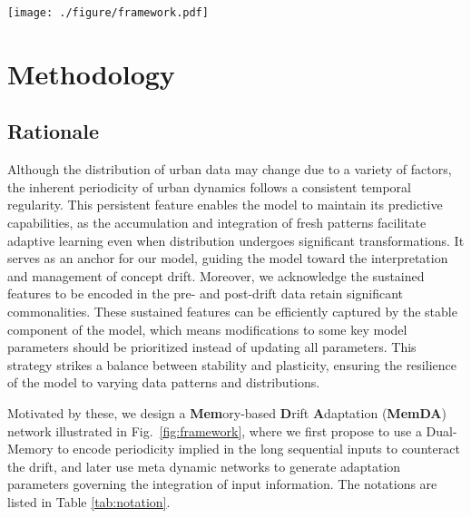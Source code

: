 \documentclass[sigconf]{acmart}
\begin{document}
\begin{figure*}[h]
	\centering
	\texttt{[image: ./figure/framework.pdf]}
	\caption{The framework of the memory-based drift adaptation model.}
	\label{fig:framework}
\end{figure*}

\section{Methodology}
\subsection{Rationale}
Although the distribution of urban data may change due to a variety of factors, the inherent periodicity of urban dynamics follows a consistent temporal regularity\cite{gonzalez2008understanding}. This persistent feature enables the model to maintain its predictive capabilities, as the accumulation and integration of fresh patterns facilitate adaptive learning even when distribution undergoes significant transformations. It serves as an anchor for our model, guiding the model toward the interpretation and management of concept drift. Moreover, we acknowledge the sustained features to be encoded in the pre- and post-drift data retain significant commonalities. These sustained features can be efficiently captured by the stable component of the model, which means modifications to some key model parameters should be prioritized instead of updating all parameters. This strategy strikes a balance between stability and plasticity, ensuring the resilience of the model to varying data patterns and distributions.

Motivated by these, we design a \textbf{Mem}ory-based \textbf{D}rift \textbf{A}daptation (\textbf{MemDA}) network illustrated in Fig.~\ref{fig:framework}, where we first propose to use a Dual-Memory to encode periodicity implied in the long sequential inputs to counteract the drift, and later use meta dynamic networks to generate adaptation parameters governing the integration of input information. The notations are listed in Table \ref{tab:notation}.
\end{document}
